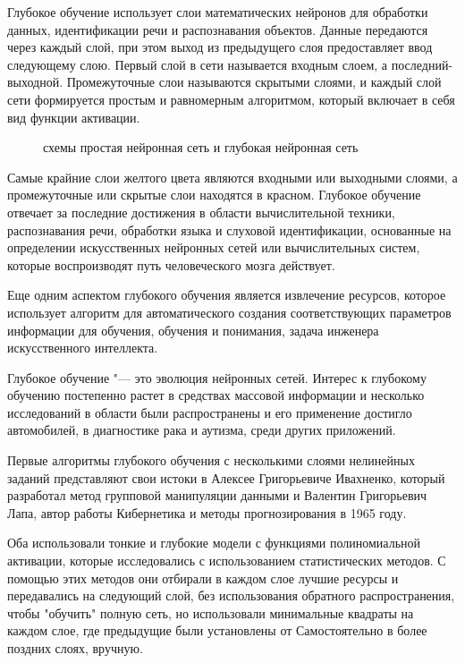  Глубокое обучение использует слои математических нейронов для обработки данных, идентификации речи и распознавания объектов. 
 Данные передаются через каждый слой, при этом выход из предыдущего слоя предоставляет ввод следующему слою.
 Первый слой в сети называется входным слоем, а последний-выходной.
 Промежуточные слои называются скрытыми слоями, и каждый слой сети формируется простым и равномерным алгоритмом, 
 который включает в себя вид функции активации.

 \begin{figure*}[h]
    \caption{схемы простая нейронная сеть и глубокая нейронная сеть}
 \end{figure*}

 Самые крайние слои желтого цвета являются входными или выходными слоями, 
 а промежуточные или скрытые слои находятся в красном. 
 Глубокое обучение отвечает за последние достижения в области вычислительной техники, 
 распознавания речи, обработки языка и слуховой идентификации,
 основанные на определении искусственных нейронных сетей или вычислительных систем,
 которые воспроизводят путь человеческого мозга действует. 

 Еще одним аспектом глубокого обучения является извлечение ресурсов, 
 которое использует алгоритм для автоматического создания соответствующих параметров информации для обучения,
 обучения и понимания, задача инженера искусственного интеллекта.

 Глубокое обучение "--- это эволюция нейронных сетей.
 Интерес к глубокому обучению постепенно растет в средствах массовой
 информации и несколько исследований в области были распространены и
 его применение достигло автомобилей, в диагностике рака и аутизма,
 среди других приложений.

 Первые алгоритмы глубокого обучения с несколькими слоями нелинейных заданий представляют свои истоки в Алексее Григорьевиче Ивахненко, 
 который разработал метод групповой манипуляции данными и Валентин Григорьевич Лапа, 
 автор работы Кибернетика и методы прогнозирования в 1965 году.

 Оба использовали тонкие и глубокие модели с функциями полиномиальной активации, 
 которые исследовались с использованием статистических методов. 
 С помощью этих методов они отбирали в каждом слое лучшие ресурсы и передавались на следующий слой, 
 без использования обратного распространения, чтобы "обучить" полную сеть, 
 но использовали минимальные квадраты на каждом слое,
 где предыдущие были установлены от Самостоятельно в более поздних слоях, вручную.

